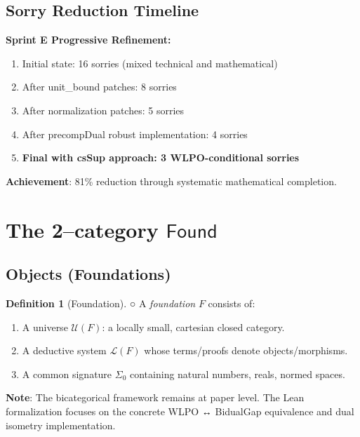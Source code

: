 \documentclass[11pt]{article}
\theoremstyle{definition}
\newtheorem{definition}[theorem]{Definition}
\theoremstyle{remark}
\newcommand{\leanpending}{\textcolor{red!70!black}{○}}
\newcommand{\sprintE}{\textcolor{orange!70!black}{\textbf{Sprint E}}}
\newcommand{\Found}{\mathsf{Found}}
\begin{document}
\subsection{Sorry Reduction Timeline}

\begin{mdframed}[style=sprintbox]
\textbf{\sprintE{} Progressive Refinement:}
\begin{enumerate}
\item Initial state: 16 sorries (mixed technical and mathematical)
\item After unit\_bound patches: 8 sorries  
\item After normalization patches: 5 sorries
\item After precompDual robust implementation: 4 sorries
\item \textbf{Final with csSup approach: 3 WLPO-conditional sorries}
\end{enumerate}

\textbf{Achievement}: 81\% reduction through systematic mathematical completion.
\end{mdframed}

\section{The 2--category \texorpdfstring{$\Found$}{Found}}\label{sec:Found}

\subsection{Objects (Foundations)}\label{ssec:Found-objects}

\begin{definition}[Foundation]\label{def:foundation} \leanpending
A \emph{foundation} \(F\) consists of:
\begin{enumerate}
\item A universe \(\mathcal U(F)\): a locally small, cartesian closed category.
\item A deductive system \(\mathcal L(F)\) whose terms/proofs denote objects/morphisms.
\item A common signature \(\Sigma_0\) containing natural numbers, reals, normed spaces.
\end{enumerate}
\end{definition}

\begin{mdframed}[style=roadmap]
\textbf{Note}: The bicategorical framework remains at paper level. The Lean formalization focuses on the concrete WLPO ↔ BidualGap equivalence and dual isometry implementation.
\end{mdframed}
\end{document}

